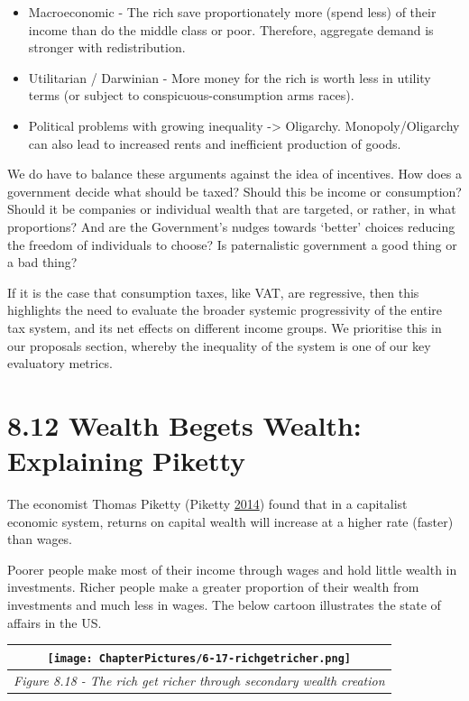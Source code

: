 \documentclass[]{tufte-handout}
\begin{document}
\begin{itemize}
\item
  Macroeconomic - The rich save proportionately more (spend less) of
  their income than do the middle class or poor. Therefore, aggregate
  demand is stronger with redistribution.
\item
  Utilitarian / Darwinian - More money for the rich is worth less in
  utility terms (or subject to conspicuous-consumption arms races).
\item
  Political problems with growing inequality -\textgreater{} Oligarchy.
  Monopoly/Oligarchy can also lead to increased rents and inefficient
  production of goods.
\end{itemize}

We do have to balance these arguments against the idea of incentives.
How does a government decide what should be taxed? Should this be income
or consumption? Should it be companies or individual wealth that are
targeted, or rather, in what proportions? And are the Government's
nudges towards `better' choices reducing the freedom of individuals to
choose? Is paternalistic government a good thing or a bad thing?

If it is the case that consumption taxes, like VAT, are regressive, then
this highlights the need to evaluate the broader systemic progressivity
of the entire tax system, and its net effects on different income
groups. We prioritise this in our proposals section, whereby the
inequality of the system is one of our key evaluatory metrics.

\hypertarget{wealth-begets-wealth-explaining-piketty}{%
\section{8.12 Wealth Begets Wealth: Explaining
Piketty}\label{wealth-begets-wealth-explaining-piketty}}

The economist Thomas Piketty (Piketty
\protect\hyperlink{ref-Piketty2014a}{2014}) found that in a capitalist
economic system, returns on capital wealth will increase at a higher
rate (faster) than wages.

Poorer people make most of their income through wages and hold little
wealth in investments. Richer people make a greater proportion of their
wealth from investments and much less in wages. The below cartoon
illustrates the state of affairs in the US.

\begin{longtable}[]{@{}c@{}}
\toprule
\texttt{[image: ChapterPictures/6-17-richgetricher.png]}\tabularnewline
\midrule
\endhead
\emph{Figure 8.18 - The rich get richer through secondary wealth
creation}\tabularnewline
\bottomrule
\end{longtable}
\end{document}
